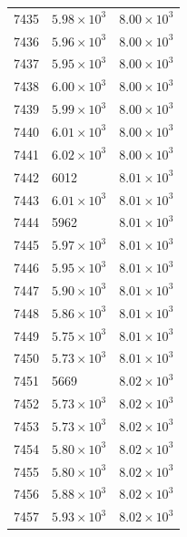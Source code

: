 \begin{table}[H]
\begin{tabular}{lll}
7435 & $\displaystyle 5.98 \times 10^{3}$ & $\displaystyle 8.00 \times 10^{3}$ \\
7436 & $\displaystyle 5.96 \times 10^{3}$ & $\displaystyle 8.00 \times 10^{3}$ \\
7437 & $\displaystyle 5.95 \times 10^{3}$ & $\displaystyle 8.00 \times 10^{3}$ \\
7438 & $\displaystyle 6.00 \times 10^{3}$ & $\displaystyle 8.00 \times 10^{3}$ \\
7439 & $\displaystyle 5.99 \times 10^{3}$ & $\displaystyle 8.00 \times 10^{3}$ \\
7440 & $\displaystyle 6.01 \times 10^{3}$ & $\displaystyle 8.00 \times 10^{3}$ \\
7441 & $\displaystyle 6.02 \times 10^{3}$ & $\displaystyle 8.00 \times 10^{3}$ \\
7442 & 6012 & $\displaystyle 8.01 \times 10^{3}$ \\
7443 & $\displaystyle 6.01 \times 10^{3}$ & $\displaystyle 8.01 \times 10^{3}$ \\
7444 & 5962 & $\displaystyle 8.01 \times 10^{3}$ \\
7445 & $\displaystyle 5.97 \times 10^{3}$ & $\displaystyle 8.01 \times 10^{3}$ \\
7446 & $\displaystyle 5.95 \times 10^{3}$ & $\displaystyle 8.01 \times 10^{3}$ \\
7447 & $\displaystyle 5.90 \times 10^{3}$ & $\displaystyle 8.01 \times 10^{3}$ \\
7448 & $\displaystyle 5.86 \times 10^{3}$ & $\displaystyle 8.01 \times 10^{3}$ \\
7449 & $\displaystyle 5.75 \times 10^{3}$ & $\displaystyle 8.01 \times 10^{3}$ \\
7450 & $\displaystyle 5.73 \times 10^{3}$ & $\displaystyle 8.01 \times 10^{3}$ \\
7451 & 5669 & $\displaystyle 8.02 \times 10^{3}$ \\
7452 & $\displaystyle 5.73 \times 10^{3}$ & $\displaystyle 8.02 \times 10^{3}$ \\
7453 & $\displaystyle 5.73 \times 10^{3}$ & $\displaystyle 8.02 \times 10^{3}$ \\
7454 & $\displaystyle 5.80 \times 10^{3}$ & $\displaystyle 8.02 \times 10^{3}$ \\
7455 & $\displaystyle 5.80 \times 10^{3}$ & $\displaystyle 8.02 \times 10^{3}$ \\
7456 & $\displaystyle 5.88 \times 10^{3}$ & $\displaystyle 8.02 \times 10^{3}$ \\
7457 & $\displaystyle 5.93 \times 10^{3}$ & $\displaystyle 8.02 \times 10^{3}$ \\

\end{tabular}
\end{table}
